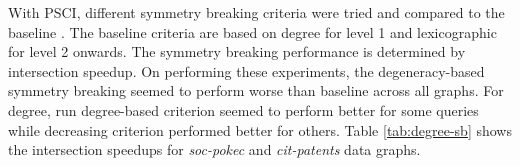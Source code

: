 With PSCI, different symmetry breaking criteria were tried and compared to the baseline \cite{PARSEC_VD}.
The baseline criteria are based on degree for level 1 and lexicographic for level 2 onwards.
The symmetry breaking performance is determined by intersection speedup.
On performing these experiments, the degeneracy-based symmetry breaking seemed to perform worse than baseline across all graphs.
For degree, run  degree-based criterion seemed to perform better for some queries while decreasing criterion performed better for others.
Table \ref{tab:degree-sb} shows the intersection speedups for \textit{soc-pokec} and \textit{cit-patents} data graphs.

\begin{table}[h]
    \centering
    \caption{Intersection Speedup with Degree based Symmetry Breaking}

    \label{tab:degree-sb}
\end{table}


